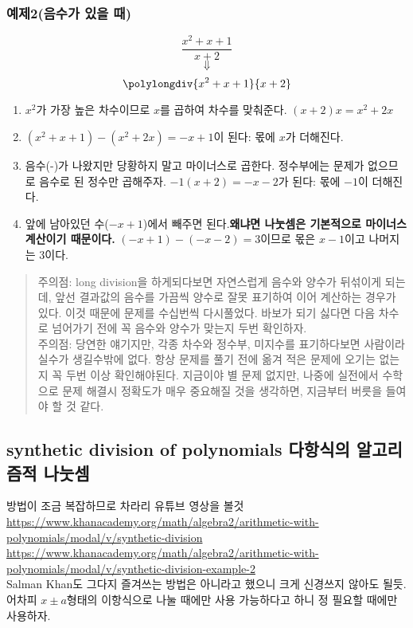 \documentclass{article}
\begin{document}
\subsubsection{예제2(음수가 있을 때)}
$$\frac{x^{2}+x+1}{x+2}$$
$$\Downarrow$$
$$\polylongdiv{x^{2}+x+1}{x+2}$$
\begin{enumerate}
\item $x^{2}$가 가장 높은 차수이므로 $x$를 곱하여 차수를 맞춰준다. $(x+2)x=x^{2}+2x$
\item $(x^{2}+x+1)-(x^{2}+2x)=-x+1$이 된다: 몫에 $x$가 더해진다.
\item 음수(-)가 나왔지만 당황하지 말고 마이너스로 곱한다. 정수부에는 문제가 없으므로 음수로 된 정수만 곱해주자. $-1(x+2)=-x-2$가 된다: 몫에 $-1$이 더해진다.
\item 앞에 남아있던 수($-x+1$)에서 빼주면 된다.\textbf{왜냐면 나눗셈은 기본적으로 마이너스 계산이기 때문이다.} $(-x+1)-(-x-2)=3$이므로 몫은 $x-1$이고 나머지는 $3$이다.
\end{enumerate}
\begin{quote}
{\color{red} 주의점}: long division을 하게되다보면 자연스럽게 음수와 양수가 뒤섞이게 되는데, 앞선 결과값의 음수를 가끔씩 양수로 잘못 표기하여 이어 계산하는 경우가 있다. 이것 때문에 문제를 수십번씩 다시풀었다. 바보가 되기 싫다면 다음 차수로 넘어가기 전에 꼭 음수와 양수가 맞는지 두번 확인하자.\\
{\color{red} 주의점}: 당연한 얘기지만, 각종 차수와 정수부, 미지수를 표기하다보면 사람이라 실수가 생길수밖에 없다. 항상 문제를 풀기 전에 옮겨 적은 문제에 오기는 없는지 꼭 두번 이상 확인해야된다. 지금이야 별 문제 없지만, 나중에 실전에서 수학으로 문제 해결시 정확도가 매우 중요해질 것을 생각하면, 지금부터 버릇을 들여야 할 것 같다.
\end{quote}

\subsection{synthetic division of polynomials 다항식의 알고리즘적 나눗셈}
방법이 조금 복잡하므로 차라리 유튜브 영상을 볼것
\vspace{12pt}\\
\url{https://www.khanacademy.org/math/algebra2/arithmetic-with-polynomials/modal/v/synthetic-division}
\vspace{12pt}\\
\url{https://www.khanacademy.org/math/algebra2/arithmetic-with-polynomials/modal/v/synthetic-division-example-2}\\
Salman Khan도 그다지 즐겨쓰는 방법은 아니라고 했으니 크게 신경쓰지 않아도 될듯. 어차피 $x\pm a$형태의 이항식으로 나눌 때에만 사용 가능하다고 하니 정 필요할 때에만 사용하자.
\end{document}
